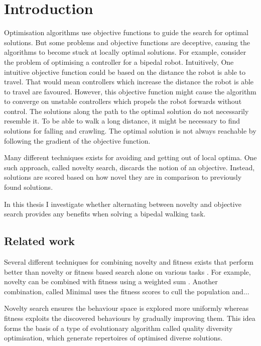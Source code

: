 \section{Introduction}



\label{sec:intro}

Optimisation algorithms use objective functions to guide the search for optimal solutions.
But some problems and objective functions are deceptive, causing the algorithms to become stuck at
locally optimal solutions. For example, consider the problem of optimising a controller for a bipedal
robot. Intuitively, One intuitive objective function could be based on the distance the robot is able to travel.
That would mean controllers which increase the distance the robot is able to travel are favoured.
However, this objective function might cause the algorithm to converge on unstable controllers which
propels the robot forwards without control. The solutions along the path to the optimal solution
do not necessarily resemble it. To be able to walk a long distance, it might be necessary to find
solutions for falling and crawling. The optimal solution is not always reachable by following the
gradient of the objective function.

Many different techniques exists for avoiding and getting out of local optima. One such approach, called
novelty search, discards the notion of an objective. Instead, solutions are scored based on how novel
they are in comparison to previously found solutions.

In this thesis I investigate whether alternating between novelty and objective search provides
any benefits when solving a bipedal walking task.

\todo{}


\subsection{Related work}
Several different techniques for combining novelty and fitness exists that perform better than novelty or
fitness based search alone on various tasks \cite{ns_study}. For example, novelty can be combined with fitness using a weighted sum \cite{}.
Another combination, called Minimal  uses the fitness scores to cull the population and...

Novelty search ensures the behaviour space is explored more uniformly whereas fitness exploits the discovered behaviours
by gradually improving them. This idea forms the basis of a type of evolutionary algorithm called quality diversity optimisation,
which generate repertoires of optimised diverse solutions.

